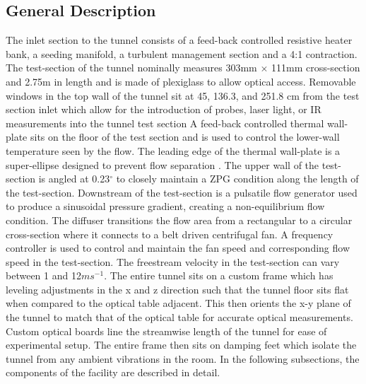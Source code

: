 \subsection{General Description}
The inlet section to the tunnel consists of a feed-back controlled resistive heater bank, a seeding manifold, a turbulent management section and a 4:1 contraction. 
The test-section of the tunnel nominally measures 303mm $\times$ 111mm cross-section and 2.75m in length and is made of plexiglass to allow optical access.
Removable windows in the top wall of the tunnel sit at 45, 136.3, and 251.8 cm from the test section inlet which allow for the introduction of probes, laser light, or IR measurements into the tunnel test section 
A feed-back controlled thermal wall-plate sits on the floor of the test section and is used to control the lower-wall temperature seen by the flow. 
The leading edge of the thermal wall-plate is a super-ellipse designed to prevent flow separation \cite{R.Narasimha1994}. 
The upper wall of the test-section is angled at 0.23$^\circ$ to closely maintain a ZPG condition along the length of the test-section. 
Downstream of the test-section is a pulsatile flow generator used to produce a sinusoidal pressure gradient, creating a non-equilibrium flow condition. 
The diffuser transitions the flow area from a rectangular to a circular cross-section where it connects to a belt driven centrifugal fan.  
A frequency controller is used to control and maintain the fan speed and corresponding flow speed in the test-section. 
The freestream velocity in the test-section can vary between 1 and 12$ms^{-1}$. 
The entire tunnel sits on a custom frame which has leveling adjustments in the x and z direction such that the tunnel floor sits flat when compared to the optical table adjacent. 
This then orients the x-y plane of the tunnel to match that of the optical table for accurate optical measurements.
Custom optical boards line the streamwise length of the tunnel for ease of experimental setup.
The entire frame then sits on damping feet which isolate the tunnel from any ambient vibrations in the room.
In the following subsections,  the components of the facility are described in detail.


